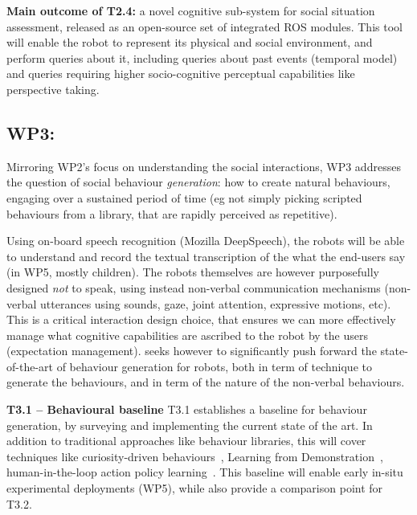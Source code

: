 \begin{framed}
    {\noindent\bf Main outcome of T2.4:} a novel cognitive sub-system for social
    situation assessment, released as an open-source set of integrated ROS
    modules. This tool will enable the robot to represent its physical and
    social environment, and perform queries about it, including queries about
    past events (temporal model) and queries requiring higher socio-cognitive
    perceptual capabilities like perspective taking.
\end{framed}





\subsection{WP3: \textbf{\wpThree}} 


Mirroring WP2's focus on understanding the social interactions, WP3 addresses the
question of social behaviour \emph{generation}: how to create natural
behaviours, engaging over a sustained period of time (eg not simply picking
scripted behaviours from a library, that are rapidly perceived as repetitive).

Using on-board speech recognition (Mozilla DeepSpeech), the robots will be able to understand and
record the textual transcription of the what the end-users say (in WP5, mostly
children). The robots themselves are however purposefully designed \emph{not} to
speak, using instead non-verbal communication mechanisms (non-verbal utterances
using sounds, gaze, joint attention, expressive motions, etc). This is a
critical interaction design choice, that ensures we can more effectively manage
what cognitive capabilities are ascribed to the robot by the users (expectation
management).  \project seeks however to significantly push forward the
state-of-the-art of behaviour generation for robots, both in term of technique to
generate the behaviours, and in term of the nature of the non-verbal behaviours.


\textbf{T3.1 -- Behavioural baseline}
T3.1 establishes a baseline for behaviour
generation, by surveying and implementing the current state of the art. In
addition to traditional approaches like behaviour libraries, this will cover
techniques like curiosity-driven behaviours~\cite{oudeyer2005playground},
Learning from Demonstration~\cite{billard2008robot, argall2009survey},
human-in-the-loop action policy learning~\cite{senft2016sparc,
senft2019teaching}. This baseline will enable early in-situ experimental
deployments (WP5), while also provide a comparison point for T3.2.


